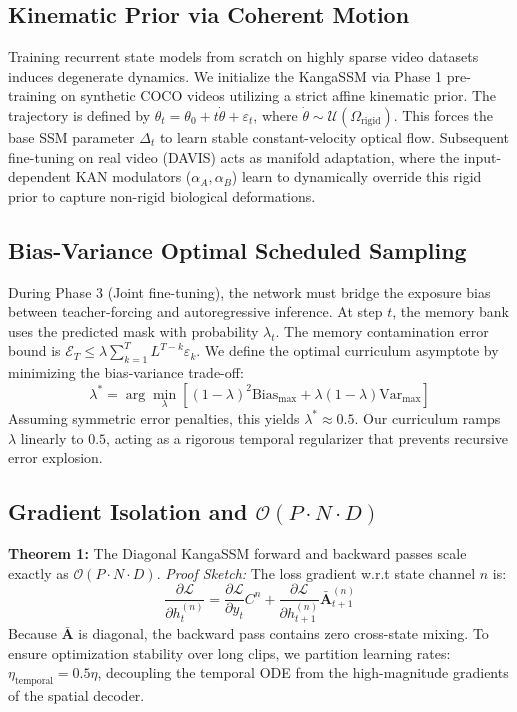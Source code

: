 \documentclass[sigconf]{acmart}
\begin{document}
\subsection{Kinematic Prior via Coherent Motion}
Training recurrent state models from scratch on highly sparse video datasets induces degenerate dynamics. We initialize the KangaSSM via Phase 1 pre-training on synthetic COCO videos utilizing a strict affine kinematic prior. The trajectory is defined by $\theta_t = \theta_0 + t\dot{\theta} + \varepsilon_t$, where $\dot{\theta} \sim \mathcal{U}(\Omega_{\text{rigid}})$. This forces the base SSM parameter $\Delta_t$ to learn stable constant-velocity optical flow. Subsequent fine-tuning on real video (DAVIS) acts as manifold adaptation, where the input-dependent KAN modulators ($\alpha_A, \alpha_B$) learn to dynamically override this rigid prior to capture non-rigid biological deformations.

\subsection{Bias-Variance Optimal Scheduled Sampling}
During Phase 3 (Joint fine-tuning), the network must bridge the exposure bias between teacher-forcing and autoregressive inference. At step $t$, the memory bank uses the predicted mask with probability $\lambda_t$. The memory contamination error bound is $\mathcal{E}_T \leq \lambda \sum_{k=1}^{T} L^{T-k} \varepsilon_k$. We define the optimal curriculum asymptote by minimizing the bias-variance trade-off:
\begin{equation}
    \lambda^* = \arg\min_\lambda \left[ (1-\lambda)^2 \text{Bias}_{\max} + \lambda(1-\lambda) \text{Var}_{\max} \right]
\end{equation}
Assuming symmetric error penalties, this yields $\lambda^* \approx 0.5$. Our curriculum ramps $\lambda$ linearly to $0.5$, acting as a rigorous temporal regularizer that prevents recursive error explosion.

\subsection{Gradient Isolation and $\mathcal{O}(P \cdot N \cdot D)$}
\textbf{Theorem 1:} The Diagonal KangaSSM forward and backward passes scale exactly as $\mathcal{O}(P \cdot N \cdot D)$.
\textit{Proof Sketch:} The loss gradient w.r.t state channel $n$ is:
\begin{equation}
    \frac{\partial \mathcal{L}}{\partial h_t^{(n)}} = \frac{\partial \mathcal{L}}{\partial y_t} C^n + \frac{\partial \mathcal{L}}{\partial h_{t+1}^{(n)}} \bar{\mathbf{A}}_{t+1}^{(n)}
\end{equation}
Because $\bar{\mathbf{A}}$ is diagonal, the backward pass contains zero cross-state mixing. To ensure optimization stability over long clips, we partition learning rates: $\eta_{\text{temporal}} = 0.5\eta$, decoupling the temporal ODE from the high-magnitude gradients of the spatial decoder.
\end{document}
